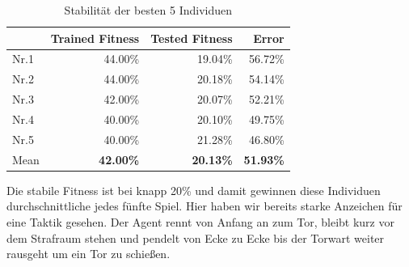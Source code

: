                 \begin{table}[H]
                    \begin{center}
                    \begin{tabular}{ |l|r|r|r| } 
                        \hline
                        \hfill & Trained Fitness   & Tested Fitness  &          Error    \\ \hline
                          Nr.1 &          44.00\%  &         19.04\% &          56.72\%  \\  
                          Nr.2 &          44.00\%  &         20.18\% &          54.14\%  \\  
                          Nr.3 &          42.00\%  &         20.07\% &          52.21\%  \\ 
                          Nr.4 &          40.00\%  &         20.10\% &          49.75\%  \\ 
                          Nr.5 &          40.00\%  &         21.28\% &          46.80\%  \\ \hline
                          Mean &  \textbf{42.00\%} & \textbf{20.13\%} & \textbf{51.93\%}  \\ \hline
                    \end{tabular}
                    \end{center}
                    \caption{Stabilität der besten 5 Individuen \label{fig:neuroevotable}}
                \end{table}

                \noindent
                Die stabile Fitness ist bei knapp 20\% und damit gewinnen diese Individuen durchschnittliche jedes fünfte Spiel. Hier haben wir bereits starke Anzeichen für eine Taktik gesehen. Der Agent rennt von Anfang an zum Tor, bleibt kurz vor dem Strafraum stehen und pendelt von Ecke zu Ecke bis der Torwart weiter rausgeht um ein Tor zu schießen.\\

